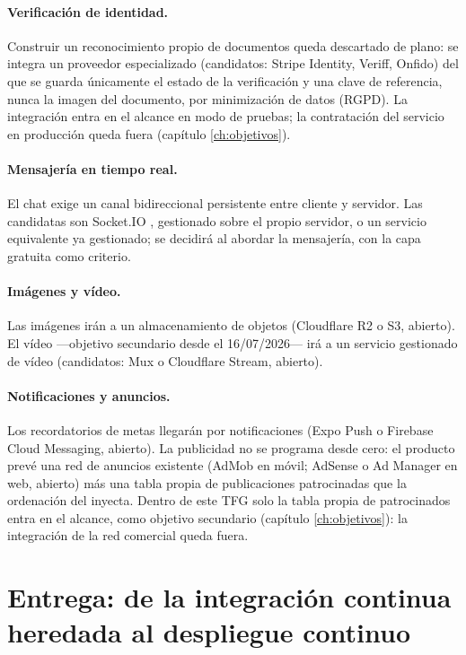 \paragraph{Verificación de identidad.}
Construir un reconocimiento propio de documentos queda descartado de plano: se integra un proveedor especializado (candidatos: Stripe Identity, Veriff, Onfido) del que se guarda únicamente el estado de la verificación y una clave de referencia, nunca la imagen del documento, por minimización de datos (\ac{RGPD}).
La integración entra en el alcance en modo de pruebas; la contratación del servicio en producción queda fuera (capítulo \ref{ch:objetivos}).

\paragraph{Mensajería en tiempo real.}
El chat exige un canal bidireccional persistente entre cliente y servidor.
Las candidatas son Socket.IO \parencite{socketio-docs}, gestionado sobre el propio servidor, o un servicio equivalente ya gestionado; se decidirá al abordar la mensajería, con la capa gratuita como criterio.

\paragraph{Imágenes y vídeo.}
Las imágenes irán a un almacenamiento de objetos (Cloudflare R2 o S3, abierto).
El vídeo —objetivo secundario desde el 16/07/2026— irá a un servicio gestionado de vídeo (candidatos: Mux o Cloudflare Stream, abierto).

\paragraph{Notificaciones y anuncios.}
Los recordatorios de metas llegarán por notificaciones  (Expo Push o Firebase Cloud Messaging, abierto).
La publicidad no se programa desde cero: el producto prevé una red de anuncios existente (AdMob en móvil; AdSense o Ad Manager en web, abierto) más una tabla propia de publicaciones patrocinadas que la ordenación del  inyecta.
Dentro de este \ac{TFG} solo la tabla propia de patrocinados entra en el alcance, como objetivo secundario (capítulo \ref{ch:objetivos}): la integración de la red comercial queda fuera.

\section{Entrega: de la integración continua heredada al despliegue continuo}
\label{sec:alt-entrega}

